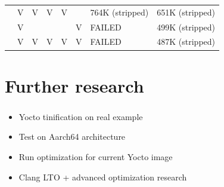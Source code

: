 \documentclass{beamer}
\begin{document}
\begin{frame}
\begin{table}
\begin{tabular}{ccccccll}
                                  & V                                    & V                                 & V                                    & V                              &                         & 764K (stripped)                                                                & 651K (stripped)                                                               \\
                                  & V                                    &                                   &                                      &                                & V                       & FAILED                                                                         & 499K (stripped)                                                               \\
                                  & V                                    & V                                 & V                                    & V                              & V                       & FAILED                                                                         & 487K (stripped)                                                              
\end{tabular}
\end{table}
\end{frame}

\section{Further research}
\begin{frame}
\frametitle{\secname}
\begin{itemize}
	    \item Yocto tinification on real example
    \item Test on Aarch64 architecture
    \item Run optimization for current Yocto image
    \item Clang LTO + advanced optimization research
\end{itemize}
\end{frame}
\end{document}
